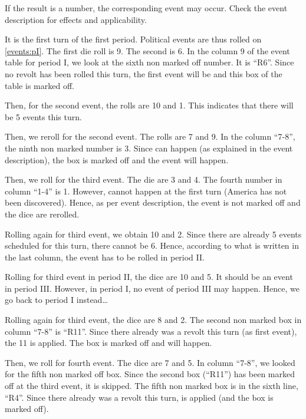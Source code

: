 \aparag If the result is a number, the corresponding event may occur.
\bparag Check the event description for effects and applicability.

\begin{exemple}
  It is the first turn of the first period. Political events are thus
  rolled on \ref{events:pI}. The first die roll is 9. The second is
  6. In the column 9 of the event table for period I, we look at the
  sixth non marked off number. It is ``R6''. Since no revolt has been
  rolled this turn, the first event will be \RD and this box of the
  table is marked off.

  Then, for the second event, the rolls are 10 and 1. This indicates
  that there will be 5 events this turn.

  Then, we reroll for the second event. The rolls are 7 and 9. In the
  column ``7-8'', the ninth non marked number is 3. Since  can happen (as explained in the event description),
  the box is marked off and the event will happen.

  Then, we roll for the third event. The die are 3 and 4. The fourth
  number in column ``1-4'' is 1. However,  cannot
  happen at the first turn (America has not been discovered). Hence, as
  per event description, the event is not marked off and the dice are
  rerolled.

  Rolling again for third event, we obtain 10 and 2. Since there are
  already 5 events scheduled for this turn, there cannot be 6. Hence,
  according to what is written in the last column, the event has to be
  rolled in period II.

  Rolling for third event in period II, the dice are 10 and 5. It should
  be an event in period III. However, in period I, no event of period
  III may happen. Hence, we go back to period I instead\ldots

  Rolling again for third event, the dice are 8 and 2. The second non
  marked box in column ``7-8'' is ``R11''. Since there already was a
  revolt this turn (as first event), the 11 is applied. The box is
  marked off and  will happen.

  Then, we roll for fourth event. The dice are 7 and 5. In column
  ``7-8'', we looked for the fifth non marked off box. Since the second
  box (``R11'') has been marked off at the third event, it is
  skipped. The fifth non marked box is in the sixth line, ``R4''. Since
  there already was a revolt this turn,  is
  applied (and the box is marked off).


\end{exemple}
